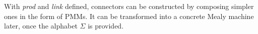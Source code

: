 \documentclass[conference, a4paper]{IEEEtran}
\newcommand{\rblock}[0]{\circleddash}
\newcommand{\rempty}[0]{\varnothing}
\newcommand{\OUT}[0]{\mbox{OUT}}
\newcommand{\IN}[0]{\mbox{IN}}
\begin{document}

With \emph{prod} and \emph{link} defined, connectors can be constructed by composing simpler ones in
the form of PMMs. It can be transformed into a concrete Mealy machine later, once the alphabet
$\Sigma$ is provided.
\end{document}
